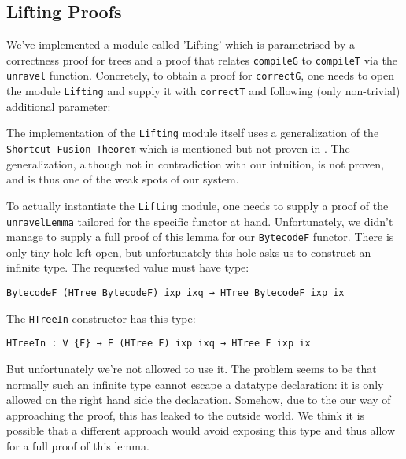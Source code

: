 \documentclass[a4paper]{article}
\begin{document}
        \subsection{Lifting Proofs}
        
        
        We've implemented a module called 'Lifting' which is parametrised by a correctness proof for trees and a proof that relates \texttt{compileG} 
        to \texttt{compileT} via the \texttt{unravel} function. Concretely, to obtain a proof for \texttt{correctG}, one needs to open the module 
        \texttt{Lifting} and supply it with \texttt{correctT} and following (only non-trivial) additional parameter:
        
        
        The implementation of the \texttt{Lifting} module itself uses a generalization of the \texttt{Shortcut Fusion Theorem} which is mentioned but not proven in \cite{compiler-correctness-structured-graphs}.
        The generalization, although not in contradiction with our intuition, is not proven, and is thus one of the weak spots of our system.
        
        To actually instantiate the \texttt{Lifting} module, one needs to supply a proof of the \texttt{unravelLemma} tailored for the specific functor at hand. 
        Unfortunately, we didn't manage to supply a full proof of this lemma for our \texttt{BytecodeF} functor. There is only tiny hole left open, but 
        unfortunately this hole asks us to construct an infinite type. The requested value must have type:
        \begin{verbatim}
BytecodeF (HTree BytecodeF) ixp ixq → HTree BytecodeF ixp ix
        \end{verbatim}
        
        The \texttt{HTreeIn} constructor has this type:
        
        \begin{verbatim}
HTreeIn : ∀ {F} → F (HTree F) ixp ixq → HTree F ixp ix
        \end{verbatim}
        
        But unfortunately we're not allowed to use it. The problem seems to be that normally such an infinite type cannot escape a datatype declaration: 
        it is only allowed on the right hand side the declaration. Somehow, due to the our way of approaching the proof, this has leaked to the outside world.
        We think it is possible that a different approach would avoid exposing this type and thus allow for a full proof of this lemma.
\end{document}
